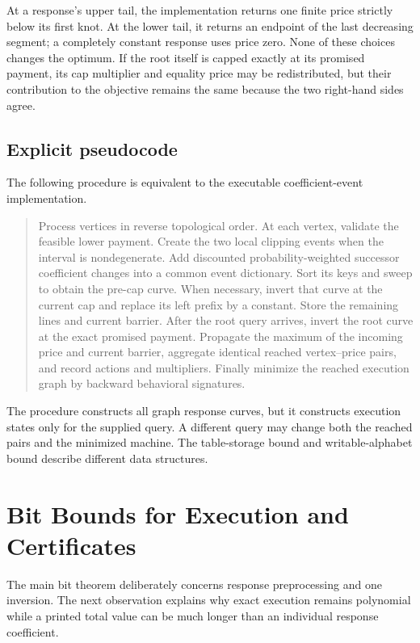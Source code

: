 At a response's upper tail, the implementation returns one finite price strictly below its first knot. At the lower tail, it returns an endpoint of the last decreasing segment; a completely constant response uses price zero. None of these choices changes the optimum. If the root itself is capped exactly at its promised payment, its cap multiplier and equality price may be redistributed, but their contribution to the objective remains the same because the two right-hand sides agree.

\subsection{Explicit pseudocode}
The following procedure is equivalent to the executable coefficient-event implementation.
\begin{quote}\small
Process vertices in reverse topological order. At each vertex, validate the feasible lower payment. Create the two local clipping events when the interval is nondegenerate. Add discounted probability-weighted successor coefficient changes into a common event dictionary. Sort its keys and sweep to obtain the pre-cap curve. When necessary, invert that curve at the current cap and replace its left prefix by a constant. Store the remaining lines and current barrier. After the root query arrives, invert the root curve at the exact promised payment. Propagate the maximum of the incoming price and current barrier, aggregate identical reached vertex--price pairs, and record actions and multipliers. Finally minimize the reached execution graph by backward behavioral signatures.
\end{quote}
The procedure constructs all graph response curves, but it constructs execution states only for the supplied query. A different query may change both the reached pairs and the minimized machine. The table-storage bound and writable-alphabet bound describe different data structures.

\section{Bit Bounds for Execution and Certificates}\label{ec:certificate-bits}
The main bit theorem deliberately concerns response preprocessing and one inversion. The next observation explains why exact execution remains polynomial while a printed total value can be much longer than an individual response coefficient.

